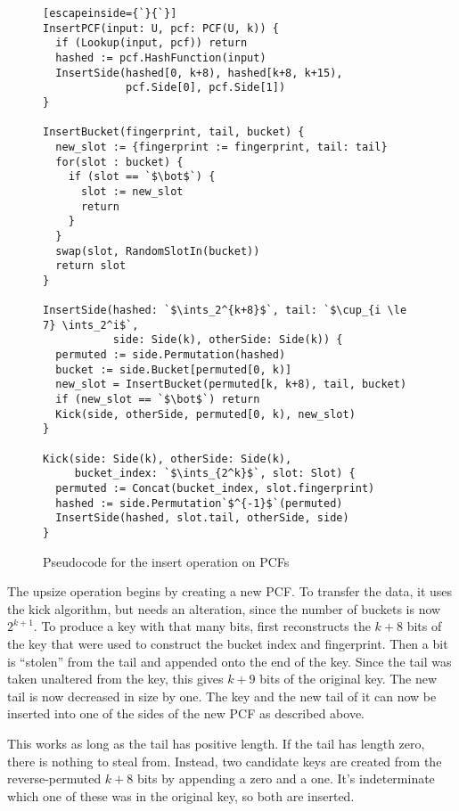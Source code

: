 \documentclass[letterpaper, 11pt]{article}
\newcommand{\ints}{\mathbb{Z}}
\begin{document}
\begin{figure}
\begin{lstlisting}[escapeinside={`}{`}]
InsertPCF(input: U, pcf: PCF(U, k)) {
  if (Lookup(input, pcf)) return
  hashed := pcf.HashFunction(input)
  InsertSide(hashed[0, k+8), hashed[k+8, k+15),
             pcf.Side[0], pcf.Side[1])
}

InsertBucket(fingerprint, tail, bucket) {
  new_slot := {fingerprint := fingerprint, tail: tail}
  for(slot : bucket) {
    if (slot == `$\bot$`) {
      slot := new_slot
      return
    }
  }
  swap(slot, RandomSlotIn(bucket))
  return slot
}

InsertSide(hashed: `$\ints_2^{k+8}$`, tail: `$\cup_{i \le 7} \ints_2^i$`,
           side: Side(k), otherSide: Side(k)) {
  permuted := side.Permutation(hashed)
  bucket := side.Bucket[permuted[0, k)]
  new_slot = InsertBucket(permuted[k, k+8), tail, bucket)
  if (new_slot == `$\bot$`) return
  Kick(side, otherSide, permuted[0, k), new_slot)
}

Kick(side: Side(k), otherSide: Side(k),
     bucket_index: `$\ints_{2^k}$`, slot: Slot) {
  permuted := Concat(bucket_index, slot.fingerprint)
  hashed := side.Permutation`$^{-1}$`(permuted)
  InsertSide(hashed, slot.tail, otherSide, side)
}
\end{lstlisting}
\caption{Pseudocode for the insert operation on PCFs}
\end{figure}

The upsize operation begins by creating a new PCF.
To transfer the data, it uses the kick algorithm, but needs an alteration, since the number of buckets is now $2^{k+1}$.
To produce a key with that many bits, first reconstructs the $k+8$ bits of the key that were used to construct the bucket index and fingerprint.
Then a bit is ``stolen'' from the tail and appended onto the end of the key.
Since the tail was taken unaltered from the key, this gives $k+9$ bits of the original key.
The new tail is now decreased in size by one.
The key and the new tail of it can now be inserted into one of the sides of the new PCF as described above.

This works as long as the tail has positive length.
If the tail has length zero, there is nothing to steal from.
Instead, two candidate keys are created from the reverse-permuted $k+8$ bits by appending a zero and a one.
It's indeterminate which one of these was in the original key, so both are inserted.
\end{document}
